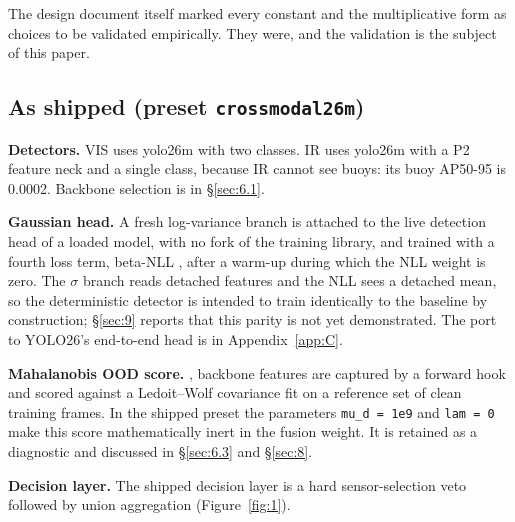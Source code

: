 \documentclass[10pt]{article}
\begin{document}
The design document itself marked every constant and the multiplicative form as choices to be validated empirically. They were, and the validation is the subject of this paper.

\subsection{As shipped (preset \texttt{crossmodal26m})}\label{sec:4.2}
\textbf{Detectors.} VIS uses yolo26m \citep{jocher2026ultralytics} with two classes. IR uses yolo26m with a P2 feature neck and a single class, because IR cannot see buoys: its buoy AP50-95 is 0.0002. Backbone selection is in \S\ref{sec:6.1}.

\textbf{Gaussian head.} A fresh log-variance branch is attached to the live detection head of a loaded model, with no fork of the training library, and trained with a fourth loss term, beta-NLL \citep{seitzer2022on}, after a warm-up during which the NLL weight is zero. The $\sigma$ branch reads detached features and the NLL sees a detached mean, so the deterministic detector is intended to train identically to the baseline by construction; \S\ref{sec:9} reports that this parity is not yet demonstrated. The port to YOLO26's end-to-end head is in Appendix~\ref{app:C}.

\textbf{Mahalanobis OOD score.} \citet{lee2018a}, backbone features are captured by a forward hook and scored against a Ledoit--Wolf covariance \citep{ledoit2004a} fit on a reference set of clean training frames. In the shipped preset the parameters \texttt{mu\_\allowbreak{}d = 1e9} and \texttt{lam = 0} make this score mathematically inert in the fusion weight. It is retained as a diagnostic and discussed in \S\ref{sec:6.3} and \S\ref{sec:8}.

\textbf{Decision layer.} The shipped decision layer is a hard sensor-selection veto followed by union aggregation (Figure~\ref{fig:1}).
\end{document}
